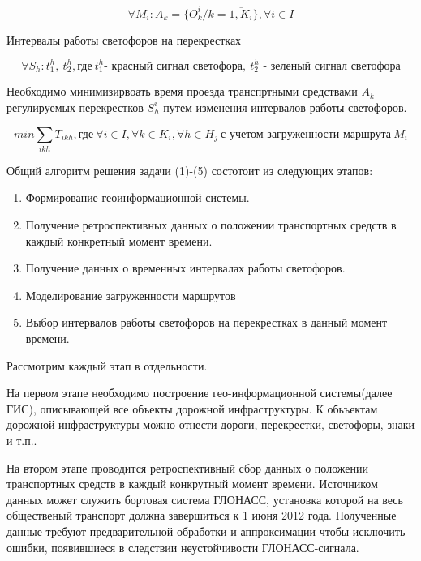 \documentclass[a4paper,13pt]{article}
\begin{document}
\begin{equation}\label{eq:objects}
\forall M_i :A_k = \{ O^i_{k}/k = \overline{1,K_i} \}, \forall{i} \in I
\end{equation}

Интервалы работы светофоров на перекрестках

\begin{equation}\label{eq:crosstime}
\forall S_h :t^h_{1},\ t^h_{2}, \text{где} \ t^h_{1}\text{- красный сигнал светофора}, \ t^h_{2}\text{ - зеленый сигнал светофора}
\end{equation}

Необходимо минимизирвоать время проезда транспртными средствами \begin{math}A_k\end{math} регулируемых перекрестков \begin{math}S^i_{h}\end{math} путем изменения интервалов работы светофоров.

\begin{equation}\label{eq:crosstimemin}
min \sum_{ikh} T_{ikh}, \text{где}\ \forall i \in I, \forall k \in K_i, \forall h \in H_j \ \text{с учетом загруженности маршрута}\ M_i
\end{equation}

Общий алгоритм решения задачи (1)-(5) состотоит из следующих этапов:
\begin{enumerate}
\item Формирование геоинформационной системы.
\item Получение ретроспективных данных о положении транспортных средств в каждый конкретный момент времени.
\item Получение данных о временных интервалах работы светофоров.
\item Моделирование загруженности маршрутов
\item Выбор интервалов работы светофоров на перекрестках в данный момент времени.
\end{enumerate}

Рассмотрим каждый этап в отдельности.

На первом этапе необходимо построение гео-информационной системы(далее ГИС), описывающей все объекты дорожной инфраструктуры. К обьъектам дорожной инфраструктуры можно отнести дороги, перекрестки, светофоры, знаки и т.п.. 

На втором этапе проводится ретроспективный сбор данных о положении транспортных средств в каждый конкрутный момент времени. Источником данных может служить бортовая система ГЛОНАСС, установка которой на весь общественый транспорт должна завершиться к 1 июня 2012 года. Полученные данные требуют предварительной обработки и аппроксимации чтобы исключить ошибки, появившиеся в следствии неустойчивости ГЛОНАСС-сигнала.
\end{document}
